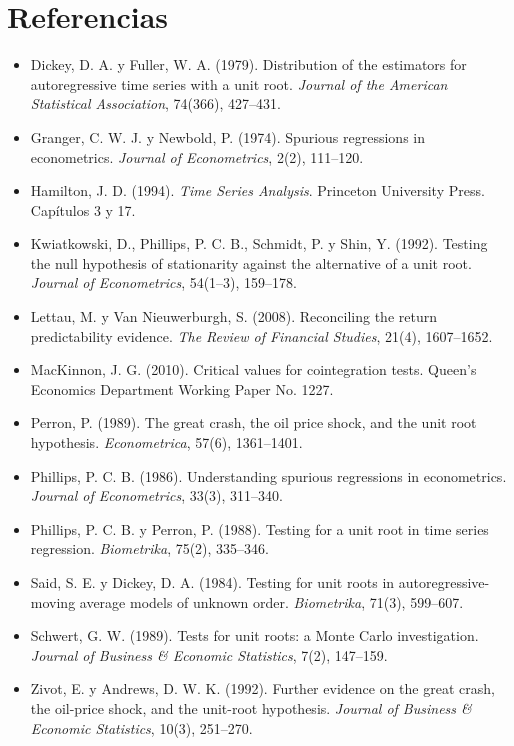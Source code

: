\section*{Referencias}
\begin{itemize}[leftmargin=*]
  \item Dickey, D. A. y Fuller, W. A. (1979). Distribution of the estimators for autoregressive time series
        with a unit root. \emph{Journal of the American Statistical Association}, 74(366), 427--431.
  \item Granger, C. W. J. y Newbold, P. (1974). Spurious regressions in econometrics. \emph{Journal of
        Econometrics}, 2(2), 111--120.
  \item Hamilton, J. D. (1994). \emph{Time Series Analysis}. Princeton University Press. Capítulos 3 y 17.
  \item Kwiatkowski, D., Phillips, P. C. B., Schmidt, P. y Shin, Y. (1992). Testing the null hypothesis of
        stationarity against the alternative of a unit root. \emph{Journal of Econometrics}, 54(1--3),
        159--178.
  \item Lettau, M. y Van Nieuwerburgh, S. (2008). Reconciling the return predictability evidence.
        \emph{The Review of Financial Studies}, 21(4), 1607--1652.
  \item MacKinnon, J. G. (2010). Critical values for cointegration tests. Queen's Economics Department
        Working Paper No. 1227.
  \item Perron, P. (1989). The great crash, the oil price shock, and the unit root hypothesis.
        \emph{Econometrica}, 57(6), 1361--1401.
  \item Phillips, P. C. B. (1986). Understanding spurious regressions in econometrics. \emph{Journal of
        Econometrics}, 33(3), 311--340.
  \item Phillips, P. C. B. y Perron, P. (1988). Testing for a unit root in time series regression.
        \emph{Biometrika}, 75(2), 335--346.
  \item Said, S. E. y Dickey, D. A. (1984). Testing for unit roots in autoregressive-moving average models of
        unknown order. \emph{Biometrika}, 71(3), 599--607.
  \item Schwert, G. W. (1989). Tests for unit roots: a Monte Carlo investigation. \emph{Journal of Business
        \& Economic Statistics}, 7(2), 147--159.
  \item Zivot, E. y Andrews, D. W. K. (1992). Further evidence on the great crash, the oil-price shock, and the
        unit-root hypothesis. \emph{Journal of Business \& Economic Statistics}, 10(3), 251--270.
\end{itemize}

